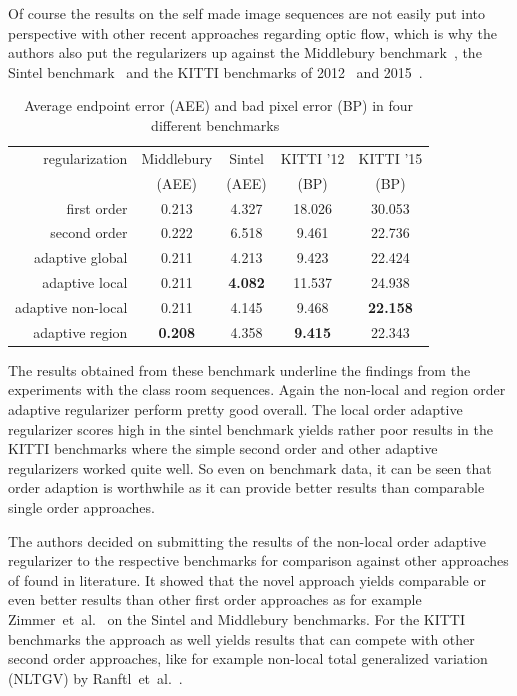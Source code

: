 \documentclass[journal]{vgtc}
\begin{document}
Of course the results on the self made image sequences are not easily put into perspective with other recent approaches regarding optic flow, which is why the authors also put the regularizers up against the Middlebury benchmark~\cite{middlebury}, the Sintel benchmark~\cite{sintel} and the KITTI benchmarks of 2012~\cite{kitti12} and 2015~\cite{kitti15}.

\begin{table}[htb]
\caption{\label{tbl:benchmarks} Average endpoint error (AEE) and bad pixel error (BP) in four different benchmarks~\cite{daspaper}}
\scriptsize
\begin{center}
\begin{tabular}{r|cccc}
regularization & Middlebury & Sintel & KITTI '12 & KITTI '15
\\
& (AEE) & (AEE) & (BP) & (BP)
\\\hline
first order        & 0.213 & 4.327 & 18.026 & 30.053
\\
second order       & 0.222 & 6.518 & 9.461 & 22.736
\\\hline
adaptive global    & 0.211 & 4.213 & 9.423 & 22.424
\\
adaptive local     & 0.211 & \textbf{4.082} & 11.537 & 24.938
\\
adaptive non-local & 0.211 & 4.145 & 9.468 & \textbf{22.158}
\\
adaptive region    & \textbf{0.208} & 4.358 & \textbf{9.415} & 22.343 
\end{tabular}
\end{center}
\end{table}

The results obtained from these benchmark underline the findings from the experiments with the class room sequences.
Again the non-local and region order adaptive regularizer perform pretty good overall.
The local order adaptive regularizer scores high in the sintel benchmark yields rather poor results in the KITTI benchmarks where the simple second order and other adaptive regularizers worked quite well.
So even on benchmark data, it can be seen that order adaption is worthwhile as it can provide better results than comparable single order approaches.

The authors decided on submitting the results of the non-local order adaptive regularizer to the respective benchmarks for comparison against other approaches of found in literature.
It showed that the novel approach yields comparable or even better results than other first order approaches as for example Zimmer~et~al.~\cite{opticflowinharmony} on the Sintel and Middlebury benchmarks.
For the KITTI benchmarks the approach as well yields results that can compete with other second order approaches, like for example non-local total generalized variation (NLTGV) by Ranftl~et~al.~\cite{nltgv}.
\end{document}
